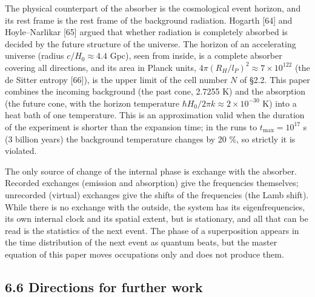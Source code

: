\documentclass[
  a4paper,
]{article}
\begin{document}
The physical counterpart of the absorber is the cosmological event
horizon, and its rest frame is the rest frame of the background
radiation. Hogarth {[}64{]} and Hoyle--Narlikar {[}65{]} argued that
whether radiation is completely absorbed is decided by the future
structure of the universe. The horizon of an accelerating universe
(radius \(c/H_0\approx4.4\) Gpc), seen from inside, is a complete
absorber covering all directions, and its area in Planck units,
\(4\pi(R_H/l_P)^2\approx7\times10^{122}\) (the de Sitter entropy
{[}66{]}), is the upper limit of the cell number \(N\) of §2.2. This
paper combines the incoming background (the past cone, 2.7255 K) and the
absorption (the future cone, with the horizon temperature
\(\hbar H_0/2\pi k\approx2\times10^{-30}\) K) into a heat bath of one
temperature. This is an approximation valid when the duration of the
experiment is shorter than the expansion time; in the runs to
\(t_{\max}=10^{17}\) s (3 billion years) the background temperature
changes by 20 \%, so strictly it is violated.

The only source of change of the internal phase is exchange with the
absorber. Recorded exchanges (emission and absorption) give the
frequencies themselves; unrecorded (virtual) exchanges give the shifts
of the frequencies (the Lamb shift). While there is no exchange with the
outside, the system has its eigenfrequencies, its own internal clock and
its spatial extent, but is stationary, and all that can be read is the
statistics of the next event. The phase of a superposition appears in
the time distribution of the next event as quantum beats, but the master
equation of this paper moves occupations only and does not produce them.

\subsection{6.6 Directions for further
work}\label{directions-for-further-work}
\end{document}
